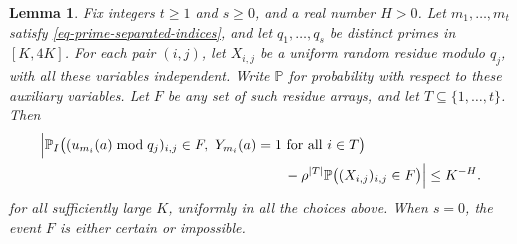 \documentclass[11pt,reqno]{amsart}
\numberwithin{equation}{section}
\newtheorem{lemma}[theorem]{Lemma}
\begin{document}
\begin{lemma}\label{lem-prime-residue-comparison}
Fix integers $t\ge1$ and $s\ge0$, and a real number $H>0$. Let $m_1,\ldots,m_t$ satisfy \eqref{eq-prime-separated-indices}, and let $q_1,\ldots,q_s$ be distinct primes in $[K,4K]$. For each pair $(i,j)$, let $X_{i,j}$ be a uniform random residue modulo $q_j$, with all these variables independent. Write $\mathbb P$ for probability with respect to these auxiliary variables. Let $F$ be any set of such residue arrays, and let $T\subseteq\{1,\ldots,t\}$. Then
\begin{equation}\label{eq-prime-residue-comparison}
 \begin{aligned}
 \Bigl|\mathbb P_I\bigl((u_{m_i}(a)\bmod q_j)_{i,j}\in F,\
                  Y_{m_i}(a)&=1\text{ for all }i\in T\bigr)\\
 &\qquad{}-\rho^{|T|}\mathbb P\bigl((X_{i,j})_{i,j}\in F\bigr)\Bigr|
 \le K^{-H}.
 \end{aligned}
\end{equation}
for all sufficiently large $K$, uniformly in all the choices above. When $s=0$, the event $F$ is either certain or impossible.
\end{lemma}
\end{document}
